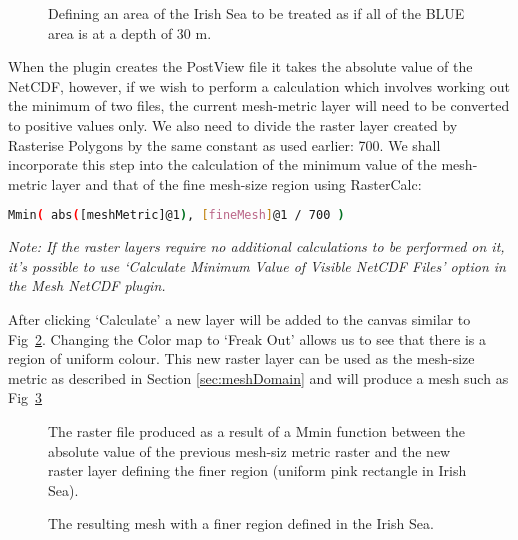 \begin{figure}[h!]
  \centering
  \caption{Defining an area of the Irish Sea to be treated as if all of the BLUE area is at a depth of 30 m.}
  \label{fig:mn_fineRegion}
\end{figure}

When the plugin creates the PostView file it takes the absolute value of the NetCDF, however, if we wish to perform a calculation which involves working out the minimum of two files, the current mesh-metric layer will need to be converted to positive values only. We also need to divide the raster layer created by Rasterise Polygons by the same constant as used earlier: 700. We shall incorporate this step into the calculation of the minimum value of the mesh-metric layer and that of the fine mesh-size region using RasterCalc:

\begin{example}
  \begin{lstlisting}[language=bash]
  Mmin( abs([meshMetric]@1), [fineMesh]@1 / 700 )
  \end{lstlisting}
\end{example}


\emph{Note: If the raster layers require no additional calculations to be performed on it, it's possible to use `Calculate Minimum Value of Visible NetCDF Files' option in the Mesh NetCDF plugin.}

After clicking `Calculate' a new layer will be added to the canvas similar to Fig~\ref{fig:mn_minCalc}. Changing the Color map to `Freak Out' allows us to see that there is a region of uniform colour. This new raster layer can be used as the mesh-size metric as described in Section \ref{sec:meshDomain} and will produce a mesh such as Fig~\ref{fig:mn_meshFine}

\begin{figure}[h!]
  \centering
  \caption{The raster file produced as a result of a Mmin function between the absolute value of the previous mesh-siz metric raster and the new raster layer defining the finer region (uniform pink rectangle in Irish Sea).}
  \label{fig:mn_minCalc}
\end{figure}

\begin{figure}[h!]
  \centering
  \caption{The resulting mesh with a finer region defined in the Irish Sea.}
  \label{fig:mn_meshFine}
\end{figure}

